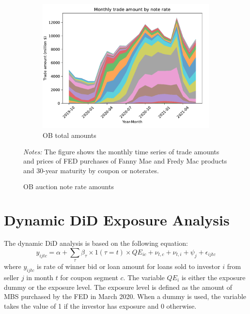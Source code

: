 \documentclass[11pt,a4paper]{article}
\begin{document}

\begin{figure}[h]
  \centering
   \begin{subfigure}[b]{0.75\textwidth}
    \includegraphics[width=0.998\textwidth]{../results/figures/ob_monthly_trade_amount_by_noterate_all_area_legend_colors.pdf}
    \caption{OB total amounts}
   \end{subfigure}
   \caption{OB auction note rate amounts} 
   \begin{minipage}{\textwidth}
    \footnotesize{\textit{Notes:} The figure shows the monthly time series of trade amounts and prices of FED purchases of Fanny Mae and Fredy Mac products and 30-year maturity by coupon or noterates. } 
      \end{minipage}
\end{figure}



\pagebreak
\section{Dynamic DiD Exposure Analysis}

The dynamic DiD analysis is based on the following equation:
$$y_{ijtc} = \alpha + \sum_\tau \beta_\tau \times 1({\tau}=t)  \times QE_{ic} + \nu_{t,c} + \nu_{t,i} +\psi_{j} + \epsilon_{ijtc}$$
where $y_{ijtc}$ is rate of winner bid or loan amount for loans sold to investor $i$ from seller $j$ in month $t$ for coupon segment $c$. The variable $QE_{i}$ is either the exposure dummy or the exposure level. The exposure level is defined as the amount of MBS purchased by the FED in March 2020. When a dummy is used, the variable takes the value of 1 if the investor has exposure and 0 otherwise. 
\end{document}

